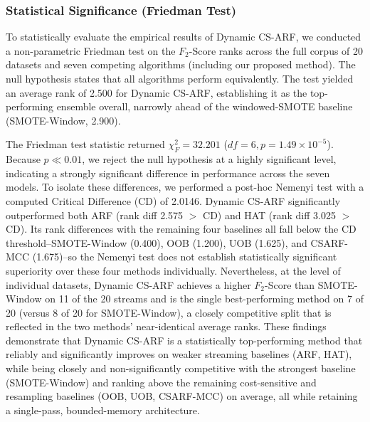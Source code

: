 \documentclass[review,12pt]{elsarticle}
\begin{document}


\subsubsection{Statistical Significance (Friedman Test)}
\label{sec:friedman}
To statistically evaluate the empirical results of Dynamic CS-ARF, we conducted a non-parametric Friedman test \cite{demsar2006statistical} on the $F_2$-Score ranks across the full corpus of 20 datasets and seven competing algorithms (including our proposed method). The null hypothesis states that all algorithms perform equivalently. The test yielded an average rank of 2.500 for Dynamic CS-ARF, establishing it as the top-performing ensemble overall, narrowly ahead of the windowed-SMOTE baseline (SMOTE-Window, 2.900).

The Friedman test statistic returned $\chi^2_F = 32.201$ ($df=6, p = 1.49 \times 10^{-5}$). Because $p \ll 0.01$, we reject the null hypothesis at a highly significant level, indicating a strongly significant difference in performance across the seven models. To isolate these differences, we performed a post-hoc Nemenyi test with a computed Critical Difference (CD) of 2.0146. Dynamic CS-ARF significantly outperformed both ARF (rank diff 2.575 $>$ CD) and HAT (rank diff 3.025 $>$ CD). Its rank differences with the remaining four baselines all fall below the CD threshold--SMOTE-Window (0.400), OOB (1.200), UOB (1.625), and CSARF-MCC (1.675)--so the Nemenyi test does not establish statistically significant superiority over these four methods individually. Nevertheless, at the level of individual datasets, Dynamic CS-ARF achieves a higher $F_2$-Score than SMOTE-Window on 11 of the 20 streams and is the single best-performing method on 7 of 20 (versus 8 of 20 for SMOTE-Window), a closely competitive split that is reflected in the two methods' near-identical average ranks. These findings demonstrate that Dynamic CS-ARF is a statistically top-performing method that reliably and significantly improves on weaker streaming baselines (ARF, HAT), while being closely and non-significantly competitive with the strongest baseline (SMOTE-Window) and ranking above the remaining cost-sensitive and resampling baselines (OOB, UOB, CSARF-MCC) on average, all while retaining a single-pass, bounded-memory architecture.
\end{document}
